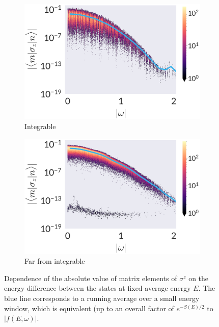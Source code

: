 \begin{figure}
	\centering
\begin{subfigure}{0.5\textwidth}
	\centering
\includegraphics[width=\columnwidth]{figures/chapter1/SigmaZ-OffOmega-I.png}
\caption{Integrable}
\end{subfigure}%
\begin{subfigure}{0.5\textwidth}
	\centering
\includegraphics[width=\columnwidth]{figures/chapter1/SigmaZ-OffOmega-NI.png}
\caption{Far from integrable}
\end{subfigure}
\caption{Dependence of the absolute value of matrix elements of $\sigma^z$ on the energy difference between the states at fixed average energy $E$. The blue line corresponds to a running average over a small energy window, which is equivalent (up to an overall factor of $e^{-S(E)/2}$ to $|f(E,\omega)|$.}
\label{fig:wdep-sigma}
\end{figure}

